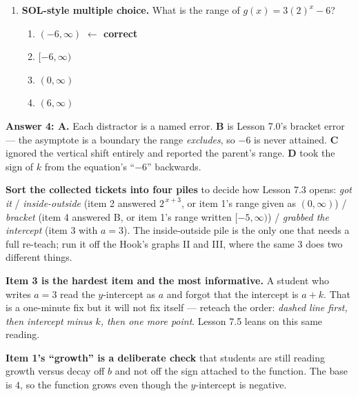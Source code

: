 \documentclass[10pt]{article}
\begin{document}
\begin{enumerate}[leftmargin=1.8em, itemsep=9pt]
  \item \textbf{SOL-style multiple choice.} What is the range of $g(x)=3(2)^{x}-6$?
        \begin{enumerate}[label=\Alph*., leftmargin=1.9em, itemsep=1pt]
          \item $(-6,\infty)$ \quad \textcolor{keyred}{\textbf{$\leftarrow$ correct}}
          \item $[-6,\infty)$
          \item $(0,\infty)$
          \item $(6,\infty)$
        \end{enumerate}
\end{enumerate}

\begin{teachernote}
\textbf{Answer 4: A.} Each distractor is a named error. \textbf{B} is Lesson 7.0's bracket error --- the
asymptote is a boundary the range \emph{excludes}, so $-6$ is never attained. \textbf{C} ignored the
vertical shift entirely and reported the parent's range. \textbf{D} took the sign of $k$ from the
equation's ``$-6$'' backwards.

\textbf{Sort the collected tickets into four piles} to decide how Lesson 7.3 opens:
\emph{got it} / \emph{inside-outside} (item 2 answered $2^{\,x+3}$, or item 1's range given as
$(0,\infty)$) / \emph{bracket} (item 4 answered B, or item 1's range written $[-5,\infty)$) /
\emph{grabbed the intercept} (item 3 with $a=3$). The inside-outside pile is the only one that needs a
full re-teach; run it off the Hook's graphs II and III, where the same $3$ does two different things.

\textbf{Item 3 is the hardest item and the most informative.} A student who writes $a=3$ read the
$y$-intercept as $a$ and forgot that the intercept is $a+k$. That is a one-minute fix but it will not
fix itself --- reteach the order: \emph{dashed line first, then intercept minus $k$, then one more
point}. Lesson 7.5 leans on this same reading.

\textbf{Item 1's ``growth'' is a deliberate check} that students are still reading growth versus decay
off $b$ and not off the sign attached to the function. The base is $4$, so the function grows even
though the $y$-intercept is negative.
\end{teachernote}
\end{document}
